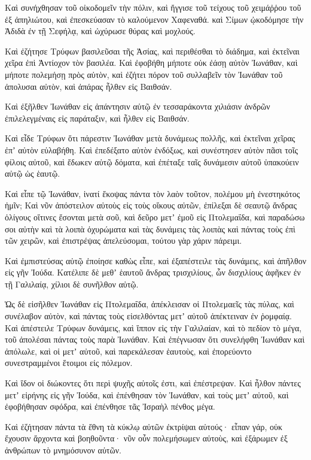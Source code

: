{Καὶ συνήχθησαν τοῦ οἰκοδομεῖν τὴν πόλιν, καὶ ἤγγισε τοῦ τείχους τοῦ χειμάῤῥου τοῦ ἐξ ἀπηλιώτου, καὶ ἐπεσκεύασαν τὸ καλούμενον Χαφεναθά.
καὶ Σίμων ᾠκοδόμησε τὴν Ἀδιδὰ ἐν τῇ Σεφήλᾳ, καὶ ὠχύρωσε θύρας καὶ μοχλούς.
\par }{\PP {}Καὶ ἐζήτησε Τρύφων βασιλεῦσαι τῆς Ἀσίας, καὶ περιθέσθαι τὸ διάδημα, καὶ ἐκτεῖναι χεῖρα ἐπὶ Ἀντίοχον τὸν βασιλέα.
Καὶ ἐφοβήθη μήποτε οὐκ ἐάσῃ αὐτὸν Ἰωνάθαν, καὶ μήποτε πολεμήσῃ πρὸς αὐτὸν, καὶ ἐζήτει πόρον τοῦ συλλαβεῖν τὸν Ἰωνάθαν τοῦ ἀπολυσαι αὐτὸν, καὶ ἀπάρας ἦλθεν εἰς Βαιθσάν.
\par }{\PP {}Καὶ ἐξῆλθεν Ἰωνάθαν εἰς ἀπάντησιν αὐτῷ ἐν τεσσαράκοντα χιλιάσιν ἀνδρῶν ἐπιλελεγμέναις εἰς παράταξιν, καὶ ἦλθεν εἰς Βαιθσάν.
\par }{\PP {}Καὶ εἶδε Τρύφων ὅτι πάρεστιν Ἰωνάθαν μετὰ δυνάμεως πολλῆς, καὶ ἐκτεῖναι χεῖρας ἐπʼ αὐτὸν εὐλαβήθη.
Καὶ ἐπεδέξατο αὐτὸν ἐνδόξως, καὶ συνέστησεν αὐτὸν πᾶσι τοῖς φίλοις αὐτοῦ, καὶ ἔδωκεν αὐτῷ δόματα, καὶ ἐπέταξε ταῖς δυνάμεσιν αὐτοῦ ὑπακούειν αὐτῷ ὡς ἑαυτῷ.
\par }{\PP {}Καὶ εἶπε τῷ Ἰωνάθαν, ἱνατί ἔκοψας πάντα τὸν λαὸν τοῦτον, πολέμου μὴ ἐνεστηκότος ἡμῖν;
Καὶ νῦν ἀπόστειλον αὐτοὺς εἰς τοὺς οἴκους αὐτῶν, ἐπίλεξαι δὲ σεαυτῷ ἄνδρας ὀλίγους οἵτινες ἔσονται μετὰ σοῦ, καὶ δεῦρο μετʼ ἐμοῦ εἰς Πτολεμαΐδα, καὶ παραδώσω σοι αὐτὴν καὶ τὰ λοιπὰ ὀχυρώματα καὶ τὰς δυνάμεις τὰς λοιπὰς καὶ πάντας τοὺς ἐπὶ τῶν χειρῶν, καὶ ἐπιστρέψας ἀπελεύσομαι, τούτου γὰρ χάριν πάρειμι.
\par }{\PP {}Καὶ ἐμπιστεύσας αὐτῷ ἐποίησε καθὼς εἶπε, καὶ ἐξαπέστειλε τὰς δυνάμεις, καὶ ἀπῆλθον εἰς γῆν Ἰούδα.
Κατέλιπε δὲ μεθʼ ἑαυτοῦ ἄνδρας τρισχιλίους, ὧν δισχιλίους ἀφῆκεν ἐν τῇ Γαλιλαίᾳ, χίλιοι δὲ συνῆλθον αὐτῷ.
\par }{\PP {}Ὡς δὲ εἰσῆλθεν Ἰωνάθαν εἰς Πτολεμαΐδα, ἀπέκλεισαν οἱ Πτολεμαεῖς τὰς πύλας, καὶ συνέλαβον αὐτὸν, καὶ πάντας τοὺς εἰσελθόντας μετʼ αὐτοῦ ἀπέκτειναν ἐν ῥομφαίᾳ.
Καὶ ἀπέστειλε Τρύφων δυνάμεις, καὶ ἵππον εἰς τὴν Γαλιλαίαν, καὶ τὸ πεδίον τὸ μέγα, τοῦ ἀπολέσαι πάντας τοὺς παρὰ Ἰωνάθαν.
Καὶ ἐπέγνωσαν ὅτι συνελήφθη Ἰωνάθαν καὶ ἀπόλωλε, καὶ οἱ μετʼ αὐτοῦ, καὶ παρεκάλεσαν ἑαυτοὺς, καὶ ἐπορεύοντο συνεστραμμένοι ἕτοιμοι εἰς πόλεμον.
\par }{\PP {}Καὶ ἴδον οἱ διώκοντες ὅτι περὶ ψυχῆς αὐτοῖς ἐστι, καὶ ἐπέστρεψαν.
Καὶ ἦλθον πάντες μετʼ εἰρήνης εἰς γῆν Ἰούδα, καὶ ἐπένθησαν τὸν Ἰωνάθαν, καὶ τοὺς μετʼ αὐτοῦ, καὶ ἐφοβήθησαν σφόδρα, καὶ ἐπένθησε τᾶς Ἰσραὴλ πένθος μέγα.
\par }{\PP {}Καὶ ἐζήτησαν πάντα τὰ ἔθνη τὰ κύκλῳ αὐτῶν ἐκτρίψαι αὐτούς· εἶπαν γάρ, οὐκ ἔχουσιν ἄρχοντα καὶ βοηθοῦντα· νῦν οὖν πολεμήσωμεν αὐτοὺς, καὶ ἐξάρωμεν ἐξ ἀνθρώπων τὸ μνημόσυνον αὐτῶν.

}
